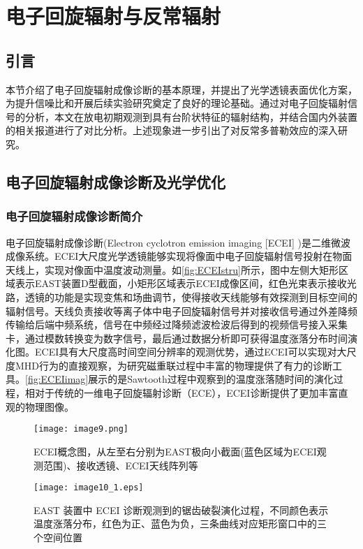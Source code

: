 
\chapter{电子回旋辐射与反常辐射}
\section*{引言}
本节介绍了电子回旋辐射成像诊断的基本原理，并提出了光学透镜表面优化方案，为提升信噪比和开展后续实验研究奠定了良好的理论基础。通过对电子回旋辐射信号的分析，本文在放电初期观测到具有台阶状特征的辐射结构，并结合国内外装置的相关报道进行了对比分析。上述现象进一步引出了对反常多普勒效应的深入研究。
\section{电子回旋辐射成像诊断及光学优化}
\subsection{电子回旋辐射成像诊断简介}\label{sec:ECEI}
电子回旋辐射成像诊断\cite{RN1020}(Electron cyclotron emission imaging [ECEI] )是二维微波成像系统。ECEI大尺度光学透镜能够实现将像面中电子回旋辐射信号投射在物面天线上，实现对像面中温度波动测量。如\autoref{fig:ECEIstru}所示，图中左侧大矩形区域表示EAST装置D型截面，小矩形区域表示ECEI成像区间，红色光束表示接收光路，透镜的功能是实现变焦和场曲调节，使得接收天线能够有效探测到目标空间的辐射信号。天线负责接收等离子体中电子回旋辐射信号并对接收信号通过外差降频传输给后端中频系统，信号在中频经过降频滤波检波后得到的视频信号接入采集卡，通过模数转换变为数字信号，最后通过数据分析即可获得温度涨落分布时间演化图。ECEI具有大尺度高时间空间分辨率的观测优势，通过ECEI可以实现对大尺度MHD行为的直接观察，为研究磁重联过程中丰富的物理提供了有力的诊断工具。\autoref{fig:ECEIimag}展示的是Sawtooth\cite{RN1791}过程中观察到的温度涨落随时间的演化过程，相对于传统的一维电子回旋辐射诊断（ECE）\cite{RN742}，ECEI诊断提供了更加丰富直观的物理图像。
\begin{figure}[ht]
  \centering
  \texttt{[image: image9.png]}
  \caption{\label{fig:ECEIstru} ECEI概念图\cite{RN1847}，从左至右分别为EAST极向小截面(蓝色区域为ECEI观测范围)、接收透镜、ECEI天线阵列等 }
\end{figure}


\begin{figure}[h]
  \centering
  \texttt{[image: image10\_1.eps]}
  \caption{\label{fig:ECEIimag}EAST 装置中 ECEI 诊断观测到的锯齿破裂演化过程，不同颜色表示温度涨落分布，红色为正、蓝色为负，三条曲线对应矩形窗口中的三个空间位置}
\end{figure}

